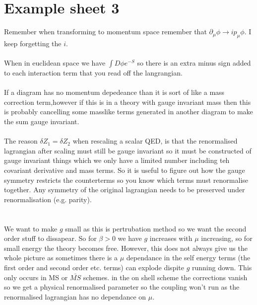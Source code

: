 \documentclass{article}
\begin{document}
       \section{Example sheet 3}
       Remember when transforming to momentum space remember that $\partial_{\mu} \phi \rightarrow i p_{\mu} \phi$. I keep forgetting the $i$.\\\\
       When in euclidean space we have $\int D \phi e^{-S}$ so there is an extra minus sign added to each interaction term that you read off the langrangian.\\\\
       If a diagram has no momentum depedeance than it is sort of like a mass correction term,however if this is in a theory with gauge invariant mass then this is probably cancelling some masslike terms generated in another diagram to make the sum gauge invariant.\\\\
       The reason $\delta Z_1 = \delta Z_2$ when rescaling a scalar QED, is that the renormalised lagrangian after scaling must still be gauge invariant so it must be constructed of gauge invariant things which we only have a limited number including teh covariant derivative and mass terms. So it is useful to figure out how the gauge symmetry restricts the counterterms so you know which terms must renormalise together. Any symmetry of the original lagrangian needs to be preserved under renormalisation (e.g. parity). \\\\\\
       We want to make $g$ small as this is pertrubation method so we want the second order stuff to dissapear. So for $\beta >0$ we have $g$ increases with $\mu$ increasing, so for small energy the theory becomes free. However, this does not always give us the whole picture as sometimes there is a $\mu$ dependance in the self energy terms (the first order and second order etc. terms) can explode dispite $g$ running down. This only occurs in MS or $\bar{MS}$ schemes. in the on shell scheme the corrections vanish so we get a physical renormalised parameter so the coupling won't run as the renormalised lagrangian has no dependance on $\mu$.\\\\
\end{document}
